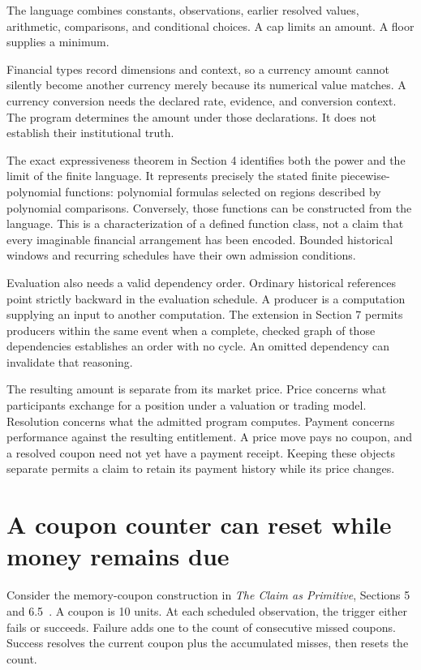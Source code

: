 \documentclass{momentum}
\begin{document}
The language combines constants, observations, earlier resolved values, arithmetic, comparisons, and conditional choices. A cap limits an amount. A floor supplies a minimum.

Financial types record dimensions and context, so a currency amount cannot silently become another currency merely because its numerical value matches. A currency conversion needs the declared rate, evidence, and conversion context. The program determines the amount under those declarations. It does not establish their institutional truth.

The exact expressiveness theorem in Section 4 identifies both the power and the limit of the finite language. It represents precisely the stated finite piecewise-polynomial functions: polynomial formulas selected on regions described by polynomial comparisons. Conversely, those functions can be constructed from the language. This is a characterization of a defined function class, not a claim that every imaginable financial arrangement has been encoded. Bounded historical windows and recurring schedules have their own admission conditions.

Evaluation also needs a valid dependency order. Ordinary historical references point strictly backward in the evaluation schedule. A producer is a computation supplying an input to another computation. The extension in Section 7 permits producers within the same event when a complete, checked graph of those dependencies establishes an order with no cycle. An omitted dependency can invalidate that reasoning.

The resulting amount is separate from its market price. Price concerns what participants exchange for a position under a valuation or trading model. Resolution concerns what the admitted program computes. Payment concerns performance against the resulting entitlement. A price move pays no coupon, and a resolved coupon need not yet have a payment receipt. Keeping these objects separate permits a claim to retain its payment history while its price changes.

\section{A coupon counter can reset while money remains due}
\label{sec:coupon}

Consider the memory-coupon construction in \emph{The Claim as Primitive}, Sections 5 and 6.5~\cite{claim}. A coupon is 10 units. At each scheduled observation, the trigger either fails or succeeds. Failure adds one to the count of consecutive missed coupons. Success resolves the current coupon plus the accumulated misses, then resets the count.
\end{document}
